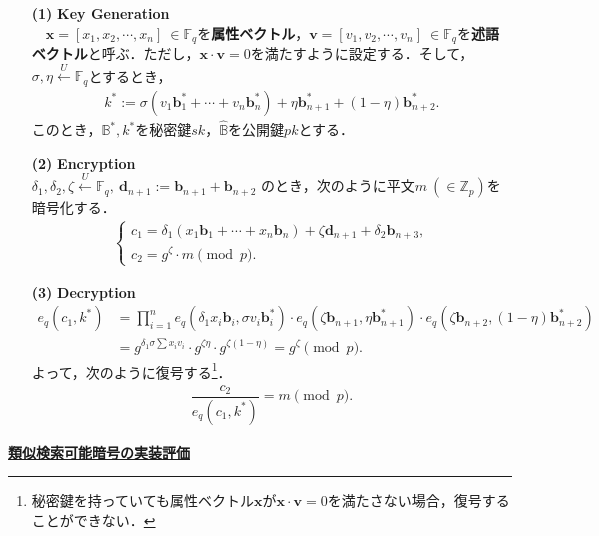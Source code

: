 \documentclass[a4paper]{jsarticle}
\begin{document}
\begin{itemize}
\item[\textbf{(1)}] \textbf{Key Generation}\\
　$\bm{x} = [x_1,x_2,\cdots,x_n]\ \in \mathbb{F}_q$を\textbf{属性ベクトル}，$\bm{v} = [v_1, v_2, \cdots, v_n]\ \in \mathbb{F}_q$を\textbf{述語ベクトル}と呼ぶ．ただし，$\bm{x}\cdot \bm{v} = 0$を満たすように設定する．そして，$\sigma, \eta\overset{U}{\leftarrow}\mathbb{F}_q$とするとき，
\begin{align}
k^* := \sigma(v_1\bm{b}^*_1 + \cdots + v_n\bm{b}^*_n) + \eta\bm{b}^*_{n+1} + (1-\eta)\bm{b}^*_{n+2}.
\end{align}
このとき，$\mathbb{B}^*, k^*$を秘密鍵$sk$，$\hat{\mathbb{B}}$を公開鍵$pk$とする．

\item[\textbf{(2)}] \textbf{Encryption}\\
$\delta_1, \delta_2, \zeta\overset{U}{\leftarrow}\mathbb{F}_q,\ \bm{d}_{n+1}:=\bm{b}_{n+1} + \bm{b}_{n+2}$
のとき，次のように平文$m\ (\in\mathbb{Z}_p)$を暗号化する．
\begin{align}
\begin{cases}
c_1 = \delta_1 (x_1\bm{b}_1 + \cdots + x_n\bm{b}_n)+\zeta \bm{d}_{n+1} + \delta_2 \bm{b}_{n+3},\\
c_2 = g^\zeta\cdot m\pmod{p}.
\end{cases}
\end{align}
\item[\textbf{(3)}] \textbf{Decryption}
\begin{align}
e_q(c_1,k^*) &= \prod_{i=1}^n e_q(\delta_1 x_i\bm{b}_i, \sigma v_i\bm{b}^*_i)\cdot e_q(\zeta\bm{b}_{n+1},\eta\bm{b}^*_{n+1})\cdot e_q(\zeta\bm{b}_{n+2},(1-\eta)\bm{b}^*_{n+2})&\\
&=g^{\delta_1\sigma\sum x_iv_i}\cdot g^{\zeta\eta}\cdot g^{\zeta(1-\eta)}=g^\zeta\pmod{p}.&
\end{align}
よって，次のように復号する\footnote{秘密鍵を持っていても属性ベクトル$\bm{x}$が$\bm{x}\cdot\bm{v} = 0$を満たさない場合，復号することができない．}．
\begin{align}
\dfrac{c_2}{e_q(c_1,k^*)} = m\pmod{p}.
\end{align}
\end{itemize}

\newpage
\begin{center}
\LARGE{\textbf{\underline{類似検索可能暗号の実装評価}}}
\end{center}
\setcounter{figure}{0}
\setcounter{table}{0}
\setcounter{equation}{0}
\setcounter{section}{0}
\end{document}
